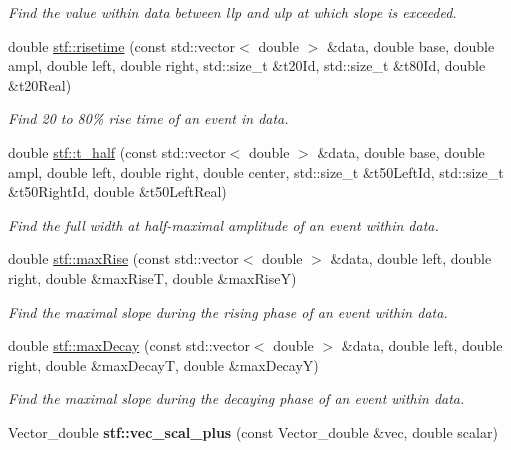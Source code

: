 \begin{DoxyCompactItemize}
\begin{DoxyCompactList}\small\item\em Find the value within {\itshape data\/} between {\itshape llp\/} and {\itshape ulp\/} at which {\itshape slope\/} is exceeded. \item\end{DoxyCompactList}\item 
double \hyperlink{group__stfgen_gada6c5911cfc604b337b76d1198d8cd37}{stf::risetime} (const std::vector$<$ double $>$ \&data, double base, double ampl, double left, double right, std::size\_\-t \&t20Id, std::size\_\-t \&t80Id, double \&t20Real)
\begin{DoxyCompactList}\small\item\em Find 20 to 80\% rise time of an event in {\itshape data\/}. \item\end{DoxyCompactList}\item 
double \hyperlink{group__stfgen_ga7c43d9ceb4e7ce199c0278b52e28386d}{stf::t\_\-half} (const std::vector$<$ double $>$ \&data, double base, double ampl, double left, double right, double center, std::size\_\-t \&t50LeftId, std::size\_\-t \&t50RightId, double \&t50LeftReal)
\begin{DoxyCompactList}\small\item\em Find the full width at half-\/maximal amplitude of an event within {\itshape data\/}. \item\end{DoxyCompactList}\item 
double \hyperlink{group__stfgen_ga3fe029fabcdd9669244b896cd57fede3}{stf::maxRise} (const std::vector$<$ double $>$ \&data, double left, double right, double \&maxRiseT, double \&maxRiseY)
\begin{DoxyCompactList}\small\item\em Find the maximal slope during the rising phase of an event within {\itshape data\/}. \item\end{DoxyCompactList}\item 
double \hyperlink{group__stfgen_ga7aea0ee12af70b3eb64016585df82eeb}{stf::maxDecay} (const std::vector$<$ double $>$ \&data, double left, double right, double \&maxDecayT, double \&maxDecayY)
\begin{DoxyCompactList}\small\item\em Find the maximal slope during the decaying phase of an event within {\itshape data\/}. \item\end{DoxyCompactList}\item 
\hypertarget{group__stfgen_ga8fefeddc3e296792aeb1c4169bcf6992}{
Vector\_\-double {\bfseries stf::vec\_\-scal\_\-plus} (const Vector\_\-double \&vec, double scalar)}
\label{group__stfgen_ga8fefeddc3e296792aeb1c4169bcf6992}


\end{DoxyCompactItemize}
